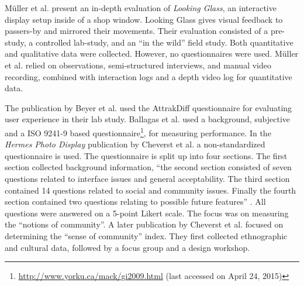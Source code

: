 	M{\"u}ller et al. \cite{Muller2012LookingGlass} present an in-depth evaluation of \textit{Looking Glass}, an interactive display setup inside of a shop window. Looking Glass gives visual feedback to passers-by and mirrored their movements. Their evaluation consisted of a pre-study, a controlled lab-study, and an ``in the wild'' field study. Both quantitative and qualitative data were collected. However, no questionnaires were used. M{\"u}ller et al. relied on observations, semi-structured interviews, and manual video recording, combined with interaction logs and a depth video log for quantitative data.

	The publication by Beyer et al. \cite{Beyer2011} used the AttrakDiff questionnaire for evaluating user experience in their lab study. 
	Ballagas et al. \cite{Ballagas2005} used a background, subjective and a ISO 9241-9 based questionnaire\footnote{\url{http://www.yorku.ca/mack/gi2009.html} (last accessed on April 24, 2015)}, for measuring performance.
	In the \textit{Hermes Photo Display} publication by Cheverst et al. \cite{cheverst2005hermes} a non-standardized questionnaire is used. The questionnaire is split up into four sections. The first section collected background information, ``the second section consisted of seven questions related to interface issues and general acceptability. The third section contained 14 questions related to social and community issues. Finally the fourth section contained two questions relating to possible future features'' \cite{cheverst2005hermes}. All questions were answered on a 5-point Likert scale. The focus was on measuring the ``notions of community''.
	A later publication by Cheverst et al. \cite{Cheverst2008} focused on determining the ``sense of community'' index. They first collected ethnographic and cultural data, followed by a focus group and a design workshop.








